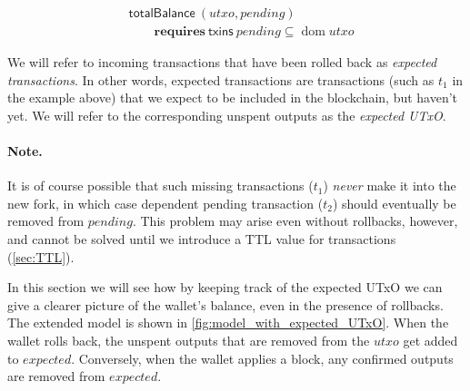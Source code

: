 \documentclass{article}
\DeclareMathOperator{\dom}{dom}
\theoremstyle{definition}{
  \newtheorem{lemma}{Lemma}[section] %
  \newtheorem{definition}[lemma]{Definition}
}
\theoremstyle{theorem}{
  \newtheorem{invariant}[lemma]{Invariant}
  \newtheorem{proofobligation}[lemma]{Proof Obligation}
}
\numberwithin{equation}{lemma}
\begin{document}
\begin{definition}
\begin{align*}
& \mathsf{totalBalance} ~ (\mathit{utxo}, \mathit{pending}) \\
& \qquad \mathbf{requires~} \mathsf{txins} ~ \mathit{pending} \subseteq \dom \mathit{utxo}
\end{align*}
\end{definition}

We will refer to incoming transactions that have been rolled back as
\emph{expected transactions}. In other words, expected transactions are
transactions (such as $t_1$ in the example above) that we expect to be included
in the blockchain, but haven't yet. We will refer to the corresponding unspent
outputs as the \emph{expected UTxO}.

\paragraph{Note.}
It is of course possible that such missing transactions ($t_1$) \emph{never}
make it into the new fork, in which case dependent pending transaction ($t_2$)
should eventually be removed from $\mathit{pending}$. This problem may arise
even without rollbacks, however, and cannot be solved until we introduce a TTL
value for transactions (\cref{sec:TTL}).

In this section we will see how by keeping track of the expected UTxO we can
give a clearer picture of the wallet's balance, even in the presence of
rollbacks. The extended model is shown in
\cref{fig:model_with_expected_UTxO}. When the wallet rolls back, the
unspent outputs that are removed from the $\mathit{utxo}$ get added to
$\mathit{expected}$. Conversely, when the wallet applies a block, any confirmed
outputs are removed from $\mathit{expected}$.
\end{document}
